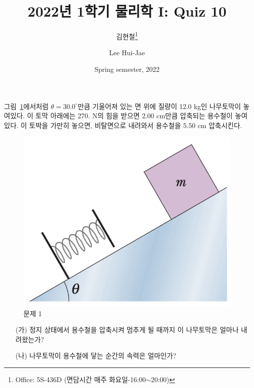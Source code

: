 \documentclass[floatfix,nofootinbib,superscriptaddress,fleqn]{revtex4-2}
\begin{document}
\title{\Large 2022년 1학기 물리학 I: Quiz 10}
\author{김현철\footnote{Office: 5S-436D (면담시간 매주
    화요일-16:00$\sim$20:00)}} 
\author{Lee Hui-Jae} 
\date{Spring semester, 2022}

\maketitle

그림~\ref{fig:2}에서처럼
$\theta=30.0^\circ$만큼 기울어져 있는 면 위에 질량이 12.0 kg인
나무토막이 놓여있다. 이 토막 아래에는 270. N의 힘을 받으면 2.00 cm만큼 
압축되는 용수철이 놓여있다. 이 토박을 가만히 놓으면, 비탈면으로
내려와서 용수철을 5.50 cm 압축시킨다.
\begin{figure}[ht]
  \centering
\includegraphics[scale=0.5]{Qfig9-2-20210330.png}  
  \caption{문제 1}
  \label{fig:2}
\end{figure}

\begin{itemize}
\item[(가)] 정지 상태에서 용수철을 압축시켜 멈추게 될 때까지 이
  나무토막은 얼마나 내려왔는가?
\item[(나)] 나무토막이 용수철에 닿는 순간의 속력은 얼마인가?   
\end{itemize}
\end{document}
